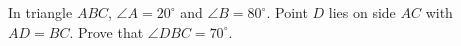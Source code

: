 In triangle $ABC$, $\angle A=20^\circ$ and $\angle B=80^\circ$. Point $D$ lies on side $AC$ with $AD=BC$. Prove that $\angle DBC=70^\circ$.
